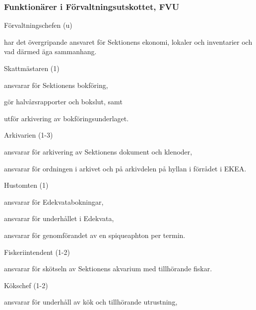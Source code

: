 \documentclass[10pt]{article}
\begin{document}
\subsubsection{Funktionärer i Förvaltningsutskottet, FVU}
\begin{emptylist}
    \item Förvaltningschefen (u)
        \begin{dashlist}
            \item har det övergripande ansvaret för Sektionens ekonomi,
                lokaler och inventarier och vad därmed äga sammanhang.
        \end{dashlist}
    \item Skattmästaren (1)
        \begin{dashlist}
            \item ansvarar för Sektionens bokföring,
            \item gör halvårsrapporter och bokslut, samt
            \item utför arkivering av bokföringsunderlaget.
        \end{dashlist}
    \item Arkivarien (1-3)
        \begin{dashlist}
            \item ansvarar för arkivering av Sektionens dokument och
                klenoder,
            \item ansvarar för ordningen i arkivet och på arkivdelen
                på hyllan i förrådet i EKEA.
        \end{dashlist}
    \item Hustomten (1)
        \begin{dashlist}
            \item ansvarar för Edekvatabokningar,
            \item ansvarar för underhållet i Edekvata,
            \item ansvarar för genomförandet av en spiqueaphton per termin.
        \end{dashlist}
    \item Fiskeriintendent (1-2)
        \begin{dashlist}
            \item ansvarar för skötseln av Sektionens akvarium med
                tillhörande fiskar.
        \end{dashlist}
    \item Kökschef (1-2)
        \begin{dashlist}
            \item ansvarar för underhåll av kök och tillhörande utrustning,

\end{dashlist}
\end{emptylist}
\end{document}
